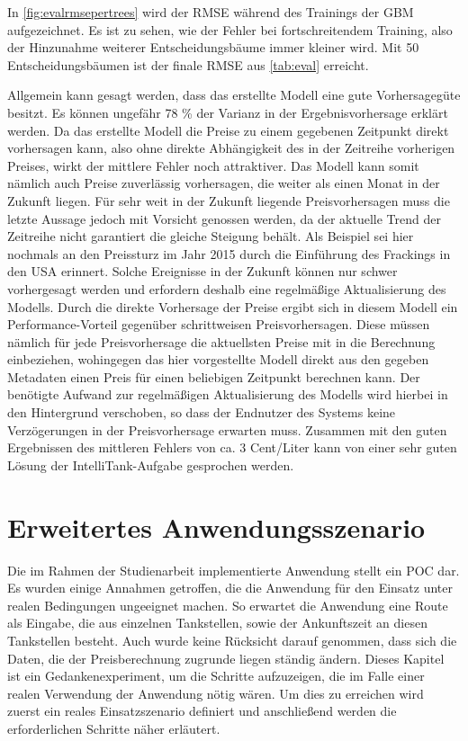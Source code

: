 \documentclass[
ngerman          %
,a4paper          %
,11pt
,pdftex
]{report}
\begin{document}
In \autoref{fig:evalrmsepertrees} wird der \ac{RMSE} während des Trainings der \acl{GBM} aufgezeichnet. Es ist zu sehen, wie der Fehler bei fortschreitendem Training, also der Hinzunahme weiterer Entscheidungsbäume immer kleiner wird. Mit 50 Entscheidungsbäumen ist der finale \ac{RMSE} aus \autoref{tab:eval} erreicht. \\
\par 

Allgemein kann gesagt werden, dass das erstellte Modell eine gute Vorhersagegüte besitzt. Es können ungefähr 78 \% der Varianz in der Ergebnisvorhersage erklärt werden. Da das erstellte Modell die Preise zu einem gegebenen Zeitpunkt direkt vorhersagen kann, also ohne direkte Abhängigkeit des in der Zeitreihe vorherigen Preises, wirkt der mittlere Fehler noch attraktiver. Das Modell kann somit nämlich auch Preise zuverlässig vorhersagen, die weiter als einen Monat in der Zukunft liegen. Für sehr weit in der Zukunft liegende Preisvorhersagen muss die letzte Aussage jedoch mit Vorsicht genossen werden, da der aktuelle Trend der Zeitreihe nicht garantiert die gleiche Steigung behält. Als Beispiel sei hier nochmals an den Preissturz im Jahr 2015 durch die Einführung des Frackings in den USA erinnert. Solche Ereignisse in der Zukunft können nur schwer vorhergesagt werden und erfordern deshalb eine regelmäßige Aktualisierung des Modells. Durch die direkte Vorhersage der Preise ergibt sich in diesem Modell ein Performance-Vorteil gegenüber schrittweisen Preisvorhersagen. Diese müssen nämlich für jede Preisvorhersage die aktuellsten Preise mit in die Berechnung einbeziehen, wohingegen das hier vorgestellte Modell direkt aus den gegeben Metadaten einen Preis für einen beliebigen Zeitpunkt berechnen kann. Der benötigte Aufwand zur regelmäßigen Aktualisierung des Modells wird hierbei in den Hintergrund verschoben, so dass der Endnutzer des Systems keine Verzögerungen in der Preisvorhersage erwarten muss. Zusammen mit den guten Ergebnissen des mittleren Fehlers von ca. 3 Cent/Liter kann von einer sehr guten Lösung der IntelliTank-Aufgabe gesprochen werden.


\chapter{Erweitertes Anwendungsszenario}
\label{sec:orgeeaadfe}
Die im Rahmen der Studienarbeit implementierte Anwendung stellt ein \ac{POC} dar. Es wurden einige Annahmen getroffen, die die Anwendung für den Einsatz unter realen Bedingungen ungeeignet machen. So erwartet die Anwendung eine Route als Eingabe, die aus einzelnen Tankstellen, sowie der Ankunftszeit an diesen Tankstellen besteht. Auch wurde keine Rücksicht darauf genommen, dass sich die Daten, die der Preisberechnung zugrunde liegen ständig ändern. Dieses Kapitel ist ein Gedankenexperiment, um die Schritte aufzuzeigen, die im Falle einer realen Verwendung der Anwendung nötig wären. Um dies zu erreichen wird zuerst ein reales Einsatzszenario definiert und anschließend werden die erforderlichen Schritte näher erläutert.
\end{document}
